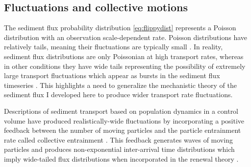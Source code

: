 \subsection{Fluctuations and collective motions}

The sediment flux probability distribution \DIFdelbegin {}\DIFdelend \ref{eq:flippydist} represents a Poisson distribution with an observation scale-dependent rate.
Poisson distributions have relatively \DIFdelbegin {}\DIFdelend \DIFaddbegin {}\DIFaddend tails, meaning their fluctuations are typically small \citep{Ancey2006}.
In reality, sediment flux distributions are only Poissonian at high transport rates, whereas in other conditions they have wide tails representing the possibility of extremely large transport fluctuations \DIFdelbegin {}\DIFdelend \DIFaddbegin {}\DIFaddend which appear as bursts \citep[e.g.][]{Goh2008} in the sediment flux timeseries \DIFdelbegin {}\DIFdelend \DIFaddbegin {}\DIFaddend . 
This highlights a need to generalize the mechanistic theory of the sediment flux I developed here to produce wider transport rate fluctuations.

Descriptions of sediment transport based on population dynamics in a control volume have produced realistically-wide fluctuations by incorporating a positive feedback between the number of moving particles and the particle entrainment rate called collective entrainment \citep{Ancey2008,Ancey2014}.
This feedback generates waves of moving particles \DIFdelbegin {}\DIFdelend \DIFaddbegin {}\DIFaddend and produces non-exponential inter-arrival time distributions \citep{Heyman2013} which imply wide-tailed flux distributions when incorporated in the renewal theory \citep[e.g.][]{Turowski2010,Ancey2020}.


